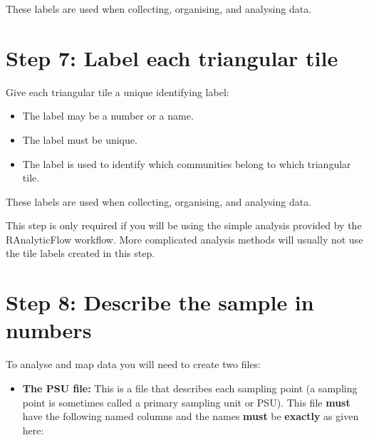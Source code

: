 \documentclass[12pt,a4paper]{book}
\providecommand{\tightlist}{%
  \setlength{\itemsep}{0pt}\setlength{\parskip}{0pt}}
\theoremstyle{definition}
\theoremstyle{definition}
\theoremstyle{definition}
\theoremstyle{remark}
\let\BeginKnitrBlock\begin \let\EndKnitrBlock\end
\begin{document}
These labels are used when collecting, organising, and analysing data.

\newpage

\hypertarget{step-7-label-each-triangular-tile}{%
\section{Step 7: Label each triangular
tile}\label{step-7-label-each-triangular-tile}}

Give each triangular tile a unique identifying label:

\begin{itemize}
\item
  The label may be a number or a name.
\item
  The label must be unique.
\item
  The label is used to identify which communities belong to which
  triangular tile.
\end{itemize}

These labels are used when collecting, organising, and analysing data.

\BeginKnitrBlock{rmdnote}
This step is only required if you will be using the simple analysis
provided by the RAnalyticFlow workflow. More complicated analysis
methods will usually not use the tile labels created in this step.
\EndKnitrBlock{rmdnote}

\newpage

\hypertarget{step-8-describe-the-sample-in-numbers}{%
\section{Step 8: Describe the sample in
numbers}\label{step-8-describe-the-sample-in-numbers}}

To analyse and map data you will need to create two files:

\begin{itemize}
\tightlist
\item
  \textbf{The PSU file:} This is a file that describes each sampling
  point (a sampling point is sometimes called a primary sampling unit or
  PSU). This file \textbf{must} have the following named columns and the
  names \textbf{must} be \textbf{exactly} as given here:
\end{itemize}
\end{document}
